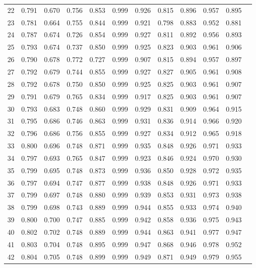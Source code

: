 \begin{longtable}[p]{|c|c|c|c|c|c|c|c|c|c|c|c|}
	22 & 0.791 & 0.670 & 0.756 & 0.853 & 0.999 & 0.926 & 0.815 & 0.896 & 0.957 & 0.895 \\
	23 & 0.781 & 0.664 & 0.755 & 0.844 & 0.999 & 0.921 & 0.798 & 0.883 & 0.952 & 0.881 \\
	24 & 0.787 & 0.674 & 0.726 & 0.854 & 0.999 & 0.927 & 0.811 & 0.892 & 0.956 & 0.893 \\
	25 & 0.793 & 0.674 & 0.737 & 0.850 & 0.999 & 0.925 & 0.823 & 0.903 & 0.961 & 0.906 \\
	26 & 0.790 & 0.678 & 0.772 & 0.727 & 0.999 & 0.907 & 0.815 & 0.894 & 0.957 & 0.897 \\
	27 & 0.792 & 0.679 & 0.744 & 0.855 & 0.999 & 0.927 & 0.827 & 0.905 & 0.961 & 0.908 \\
	28 & 0.792 & 0.678 & 0.750 & 0.850 & 0.999 & 0.925 & 0.825 & 0.903 & 0.961 & 0.907 \\
	29 & 0.791 & 0.679 & 0.765 & 0.834 & 0.999 & 0.917 & 0.825 & 0.903 & 0.961 & 0.907 \\
	30 & 0.793 & 0.683 & 0.748 & 0.860 & 0.999 & 0.929 & 0.831 & 0.909 & 0.964 & 0.915 \\
	31 & 0.795 & 0.686 & 0.746 & 0.863 & 0.999 & 0.931 & 0.836 & 0.914 & 0.966 & 0.920 \\
	32 & 0.796 & 0.686 & 0.756 & 0.855 & 0.999 & 0.927 & 0.834 & 0.912 & 0.965 & 0.918 \\
	33 & 0.800 & 0.696 & 0.748 & 0.871 & 0.999 & 0.935 & 0.848 & 0.926 & 0.971 & 0.933 \\
	34 & 0.797 & 0.693 & 0.765 & 0.847 & 0.999 & 0.923 & 0.846 & 0.924 & 0.970 & 0.930 \\
	35 & 0.799 & 0.695 & 0.748 & 0.873 & 0.999 & 0.936 & 0.850 & 0.928 & 0.972 & 0.935 \\
	36 & 0.797 & 0.694 & 0.747 & 0.877 & 0.999 & 0.938 & 0.848 & 0.926 & 0.971 & 0.933 \\
	37 & 0.799 & 0.697 & 0.748 & 0.880 & 0.999 & 0.939 & 0.853 & 0.931 & 0.973 & 0.938 \\
	38 & 0.799 & 0.698 & 0.743 & 0.889 & 0.999 & 0.944 & 0.855 & 0.933 & 0.974 & 0.940 \\
	39 & 0.800 & 0.700 & 0.747 & 0.885 & 0.999 & 0.942 & 0.858 & 0.936 & 0.975 & 0.943 \\
	40 & 0.802 & 0.702 & 0.748 & 0.889 & 0.999 & 0.944 & 0.863 & 0.941 & 0.977 & 0.947 \\
	41 & 0.803 & 0.704 & 0.748 & 0.895 & 0.999 & 0.947 & 0.868 & 0.946 & 0.978 & 0.952 \\
	42 & 0.804 & 0.705 & 0.748 & 0.899 & 0.999 & 0.949 & 0.871 & 0.949 & 0.979 & 0.955 \\

\end{longtable}
